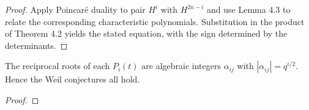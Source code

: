 \begin{proof}
Apply Poincaré duality to pair $H^i$ with $H^{2n-i}$ and use Lemma 4.3
to relate the corresponding characteristic polynomials.  Substitution in the
product of Theorem 4.2 yields the stated equation, with the sign determined by
the determinants.
\end{proof}



\begin{theorem}
\label{ha-appC-thm4-5}
The reciprocal roots of each $P_i(t)$ are algebraic integers $\alpha_{ij}$
with $|\alpha_{ij}|=q^{i/2}$.  Hence the Weil conjectures all hold.
\end{theorem}
\begin{proof}
\notready
\end{proof}
